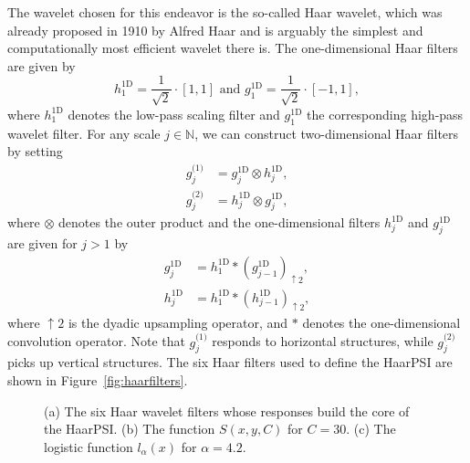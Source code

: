 \documentclass[11pt,a4paper]{article}
\newcommand{\bN}{\mathbb{N}}
\begin{document}
The wavelet chosen for this endeavor is the so-called Haar wavelet, which was already proposed in 1910 by Alfred Haar \cite{Haar1910} and is arguably the simplest and computationally most efficient wavelet there is. The one-dimensional Haar filters are given by
\begin{equation}
\label{eq:haarfilters}
h^{\text{1D}}_1 = \frac{1}{\sqrt{2}}\cdot[1,1] \text{ and } g^{\text{1D}}_1 = \frac{1}{\sqrt{2}}\cdot[-1,1],
\end{equation}
where $h^{\text{1D}}_1$ denotes the low-pass scaling filter and $g^{\text{1D}}_1$ the corresponding high-pass wavelet filter.
For any scale $j\in\bN$, we can construct two-dimensional Haar filters by setting
\begin{align*}
g^{\text{(1)}}_j &= g^{\text{1D}}_j \otimes h^{\text{1D}}_j,\\
g^{\text{(2)}}_j &= h^{\text{1D}}_j \otimes g^{\text{1D}}_j,
\end{align*}
where $\otimes$ denotes the outer product and the one-dimensional filters $h^{\text{1D}}_j$ and $g^{\text{1D}}_j$ are given for $j>1$ by
\begin{align*}
g^{\text{1D}}_j &= h^{\text{1D}}_{1}*(g^{\text{1D}}_{j-1})_{\uparrow 2}, \\
h^{\text{1D}}_j &= h^{\text{1D}}_{1}*(h^{\text{1D}}_{j-1})_{\uparrow 2},
\end{align*}
where $\uparrow2$ is the dyadic upsampling operator, and $*$ denotes the one-dimensional convolution operator. Note that $g^{\text{(1)}}_j$ responds to horizontal structures, while  $g^{\text{(2)}}_j$ picks up vertical structures. The six Haar filters used to define the HaarPSI are shown in Figure~\ref{fig:haarfilters}.


\setlength{\tabcolsep}{1mm}
\begin{figure}[!htb]
  \hfil
  \hfil
  \caption{(a) The six Haar wavelet filters whose responses build the core of the HaarPSI. (b)  The function $S(x,y,C)$ for $C=30$. (c) The logistic function $l_\alpha(x)$ for $\alpha = 4.2$.}
\end{figure}
\end{document}
